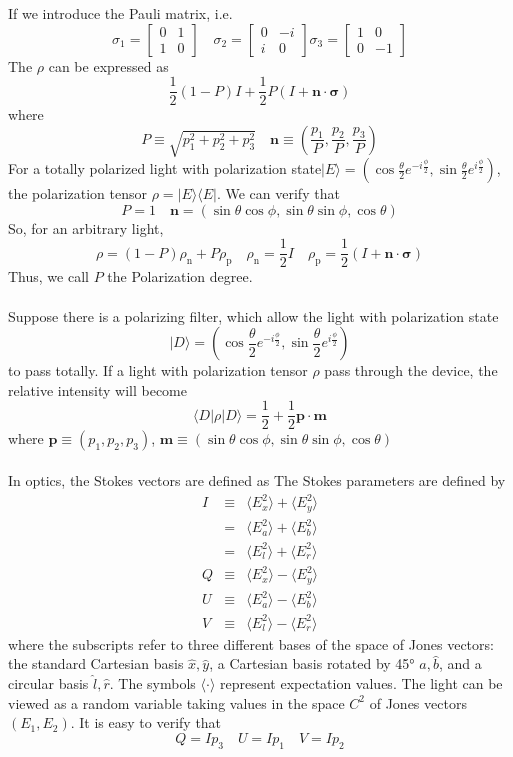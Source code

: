 If we introduce the Pauli matrix, i.e.
\[\sigma_1 = \left[ \begin{matrix} 0& 1\\ 1& 0\end{matrix} \right] \quad \sigma_2 = \left[ \begin{matrix} 0& - i\\ i& 0\end{matrix} \right] \sigma_3 = \left[ \begin{matrix} 1& 0\\ 0& -1\end{matrix} \right] \]
The $\rho$ can be expressed as
\[\frac{1}{2} (1-P) I + \frac{1}{2} P(I + \bm{n} \cdot \bm{\sigma})\]
where
\[P \equiv \sqrt{p_1^2 + p_2^2 + p_3^2} \quad \bm{n} \equiv (\frac{p_1}{P},\frac{p_2}{P},\frac{p_3}{P})\]
For a totally polarized light with polarization state$ | E\rangle = (\cos \frac{\theta}{2} e^{-i\frac{\phi}{2}} , \sin \frac{\theta}{2} e^{i\frac{\phi}{2}})$, the polarization tensor $\rho = |E\rangle \langle E|$. We can verify that
\[P = 1 \quad \bm{n} = (\sin\theta \cos\phi, \sin\theta \sin\phi, \cos \theta)\]
So, for an arbitrary light,
\[\rho = (1-P)\rho_{\mathrm{n}} + P \rho_{\mathrm{p}} \quad \rho_{\mathrm{n}} = \frac{1}{2}I \quad \rho_{\mathrm{p}} = \frac{1}{2}(I + \bm{n} \cdot \bm{\sigma})\]
Thus, we call $P$ the Polarization degree. \\ \\
Suppose there is a polarizing filter,  which allow the light with polarization state
\[| D \rangle = (\cos \frac{\theta}{2} e^{-i\frac{\phi}{2}} , \sin \frac{\theta}{2} e^{i\frac{\phi}{2}})\]
to pass totally. If a light with polarization tensor $\rho$ pass through the device, the relative intensity will become
\[\langle D | \rho | D \rangle = \frac{1}{2} + \frac{1}{2} \bm{p} \cdot \bm{m}\]
where $\bm{p} \equiv (p_1,p_2,p_3)$, $\bm{m} \equiv (\sin\theta \cos\phi, \sin\theta \sin\phi, \cos \theta)$\\ \\
In optics, the Stokes vectors are defined as
The Stokes parameters are defined by
\begin{eqnarray}
I&\equiv& \langle E_{x}^{2}\rangle +\langle E_{y}^{2}\rangle \nonumber \\
&=& \langle E_{a}^{2}\rangle +\langle E_{b}^{2}\rangle \nonumber \\
&=& \langle E_{l}^{2}\rangle +\langle E_{r}^{2}\rangle \nonumber \\
Q&\equiv& \langle E_{x}^{2}\rangle -\langle E_{y}^{2}\rangle \nonumber \\
U&\equiv& \langle E_{a}^{2}\rangle -\langle E_{b}^{2}\rangle \nonumber \\
V&\equiv& \langle E_{l}^{2}\rangle -\langle E_{r}^{2}\rangle \nonumber
\end{eqnarray}
where the subscripts refer to three different bases of the space of Jones vectors: the standard Cartesian basis ${\hat {x}},{\hat {y}}$, a Cartesian basis rotated by 45° ${\hat {a}},{\hat {b}}$, and a circular basis ${\hat {l}},{\hat {r}}$. The symbols $\langle \cdot \rangle$ represent expectation values. The light can be viewed as a random variable taking values in the space $C^2$ of Jones vectors $(E_1,E_2)$. It is easy to verify that
\[Q = Ip_3 \quad U = Ip_1 \quad V = Ip_2\]

